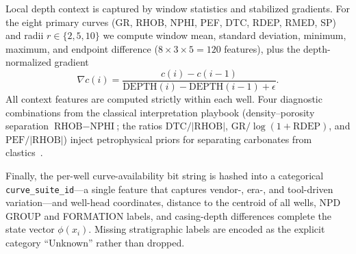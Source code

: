 \documentclass[bdcc,article,submit,pdftex,moreauthors]{Definitions/mdpi}
\begin{document}
Local depth context is captured by window statistics and stabilized gradients. For the eight
primary curves (GR, RHOB, NPHI, PEF, DTC, RDEP, RMED, SP) and radii $r\in\{2,5,10\}$ we
compute window mean, standard deviation, minimum, maximum, and endpoint difference
($8\!\times\!3\!\times\!5=120$ features), plus the depth-normalized gradient
\begin{equation}
\nabla c(i) = \frac{c(i)-c(i-1)}{\text{DEPTH}(i)-\text{DEPTH}(i-1)+\epsilon}.
\label{eq:grad}
\end{equation}
All context features are computed strictly within each well. Four diagnostic combinations
from the classical interpretation playbook (density--porosity separation $\text{RHOB}-\text{NPHI}$;
the ratios $\text{DTC}/|\text{RHOB}|$, $\text{GR}/\log(1+\text{RDEP})$, and
$\text{PEF}/|\text{RHOB}|$) inject petrophysical priors for separating carbonates from
clastics~\cite{rider2011,doveton2014}.

Finally, the per-well curve-availability bit string is hashed into a categorical
\texttt{curve\_suite\_id}---a single feature that captures vendor-, era-, and tool-driven
variation---and well-head coordinates, distance to the centroid of all wells, NPD GROUP and
FORMATION labels, and casing-depth differences complete the state vector $\phi(x_i)$. Missing
stratigraphic labels are encoded as the explicit category ``Unknown'' rather than dropped.
\end{document}
